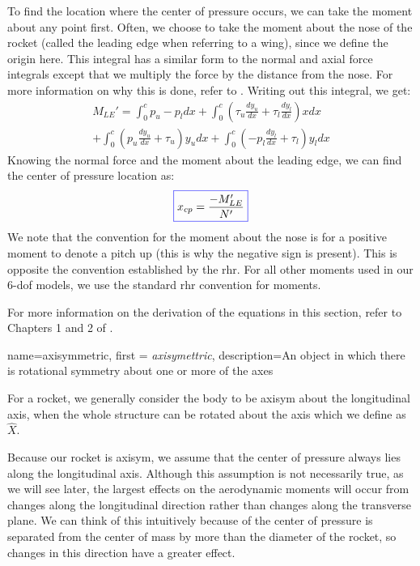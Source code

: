\documentclass[12pt]{report}
\begin{document}
To find the location where the center of pressure occurs, we can take the moment about any point first. Often, we choose to take the moment about the nose of the rocket (called the leading edge when referring to a wing), since we define the origin here. This integral has a similar form to the normal and axial force integrals except that we multiply the force by the distance from the nose. For more information on why this is done, refer to \cite{gundersen_understanding_2020}. Writing out this integral, we get:
\begin{gather}
    M_{LE}'=\int_0^c{p_u-p_l}{dx}+\int_0^c{\left(\tau_u\frac{dy_u}{dx}+\tau_l\frac{dy_l}{dx}\right)}{xdx}\\+\int_0^c{\left(p_u\frac{dy_u}{dx}+\tau_u\right)}{y_udx}+\int_0^c{\left(-p_l\frac{dy_l}{dx}+\tau_l\right)}{y_ldx}
\end{gather}
Knowing the normal force and the moment about the leading edge, we can find the center of pressure location as:
\begin{gather}
    \color{blue}\boxed{\color{black}x_{cp}=\frac{-M_{LE}'}{N'}}
\end{gather}
We note that the convention for the moment about the nose is for a positive moment to denote a pitch up (this is why the negative sign is present). This is opposite the convention established by the \gls{rhr}. For all other moments used in our 6-\gls{dof} models, we use the standard \gls{rhr} convention for moments.

For more information on the derivation of the equations in this section, refer to Chapters 1 and 2 of \cite{anderson_fundamentals_2017}.

{
    name=axisymmetric,
    first = {\textit{axisymettric}},
    description={An object in which there is rotational symmetry about one or more of the axes}
}

For a rocket, we generally consider the body to be \gls{axisym} about the longitudinal axis, when the whole structure can be rotated about the axis which we define as $\hat{X}$. 

Because our rocket is \gls{axisym}, we assume that the center of pressure always lies along the longitudinal axis. Although this assumption is not necessarily true, as we will see later, the largest effects on the aerodynamic moments will occur from changes along the longitudinal direction rather than changes along the transverse plane. We can think of this intuitively because of the center of pressure is separated from the center of mass by more than the diameter of the rocket, so changes in this direction have a greater effect.
\end{document}
